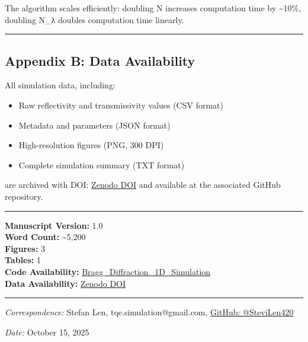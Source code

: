 \documentclass[
]{article}
\providecommand{\tightlist}{%
  \setlength{\itemsep}{0pt}\setlength{\parskip}{0pt}}
\begin{document}
The algorithm scales efficiently: doubling N increases computation time
by \textasciitilde10\%, doubling N\_λ doubles computation time linearly.

\begin{center}\rule{0.5\linewidth}{0.5pt}\end{center}

\subsection{Appendix B: Data
Availability}\label{appendix-b-data-availability}

All simulation data, including:

\begin{itemize}
\tightlist
\item
  Raw reflectivity and transmissivity values (CSV format)
\item
  Metadata and parameters (JSON format)
\item
  High-resolution figures (PNG, 300 DPI)
\item
  Complete simulation summary (TXT format)
\end{itemize}

are archived with DOI:
\href{https://doi.org/10.5281/zenodo.17358243}{Zenodo DOI} and available
at the associated GitHub repository.

\begin{center}\rule{0.5\linewidth}{0.5pt}\end{center}

\textbf{Manuscript Version:} 1.0\\
\textbf{Word Count:} \textasciitilde5,200\\
\textbf{Figures:} 3\\
\textbf{Tables:} 1\\
\textbf{Code Availability:}
\href{https://github.com/SteviLen420/Bragg_Diffraction_1D_Simulation}{Bragg\_Diffraction\_1D\_Simulation}\\
\textbf{Data Availability:}
\href{https://doi.org/10.5281/zenodo.17358243}{Zenodo DOI}

\begin{center}\rule{0.5\linewidth}{0.5pt}\end{center}

\emph{Correspondence:} Stefan Len, tqe.simulation@gmail.com,
\href{https://github.com/SteviLen420/Bragg_Diffraction_1D_Simulation}{GitHub:
@SteviLen420}

\emph{Date:} October 15, 2025
\end{document}
